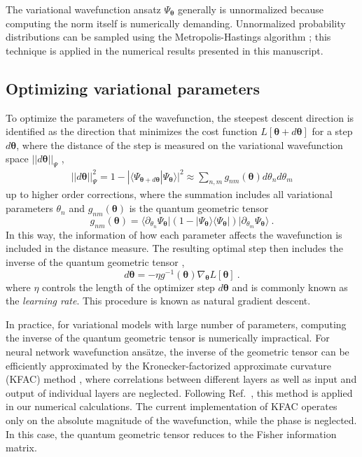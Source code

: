 \documentclass[
 reprint,
 amsmath,amssymb,
 aps, prx,
floatfix,longbibliography,
]{revtex4-2}
\begin{document}
The variational wavefunction ansatz $\Psi_{\bm \theta}$ generally is unnormalized because computing the norm itself is numerically demanding. Unnormalized probability distributions can be sampled using the Metropolis-Hastings algorithm \cite{Metropolis1949Sep,Hastings1970Apr}; this technique is applied in the numerical results presented in this manuscript. 

\subsection{Optimizing variational parameters}

To optimize the parameters of the wavefunction, the steepest descent direction is identified as the direction that minimizes the cost function $L[\bm \theta + d\bm \theta]$ for a step $d\bm \theta$, where the distance of the step is measured on the variational wavefunction space $|| d\bm \theta ||_\Psi$ \cite{Amari1998Feb},
\begin{align}
    || d\bm \theta ||_\Psi^2 = 1 - |\langle \Psi_{\bm \theta  + d\bm \theta} | \Psi_{\bm \theta}\rangle|^2 \approx \sum_{n,m} g_{nm}(\bm \theta) d\theta_n d\theta_m 
\end{align}
up to higher order corrections, where the summation includes all variational parameters $\theta_n$ and $g_{nm}(\bm \theta)$ is the quantum geometric tensor
\begin{equation}
    g_{nm}(\bm \theta) = \langle \partial_{\theta_n} \Psi_{\bm \theta } | \left(1 - |\Psi_{\bm \theta}\rangle\langle\Psi_{\bm \theta}| \right)| \partial_{\theta_m} \Psi_{\bm \theta }\rangle \ .
    \label{eq:VMC-geometric-tensor}
\end{equation}
In this way, the information of how each parameter affects the wavefunction is included in the distance measure. The resulting optimal step then includes the inverse of the quantum geometric tensor \cite{Amari1998Feb},
\begin{equation}
    d\bm \theta = -\eta g^{-1}(\bm \theta) \nabla_{\bm \theta} L[\bm \theta] \ .
    \label{eq:VMC-steepest-descent}
\end{equation}
where $\eta$ controls the length of the optimizer step $d \bm \theta$ and is commonly known as the \emph{learning rate}. 
This procedure is known as natural gradient descent. 

In practice, for variational models with large number of parameters, computing the inverse of the quantum geometric tensor is numerically impractical. For neural network wavefunction ans\"atze, the inverse of the geometric tensor can be efficiently approximated by the Kronecker-factorized approximate curvature (KFAC) method  \cite{Martens2015Jun,Pfau2020Sep}, where correlations between different layers as well as input and output of individual layers are neglected. Following Ref.~\cite{Pfau2020Sep}, this method is applied in our numerical calculations. The current implementation of KFAC operates only on the absolute magnitude of the wavefunction, while the phase is neglected. In this case, the quantum geometric tensor reduces to the Fisher information matrix.
\end{document}
